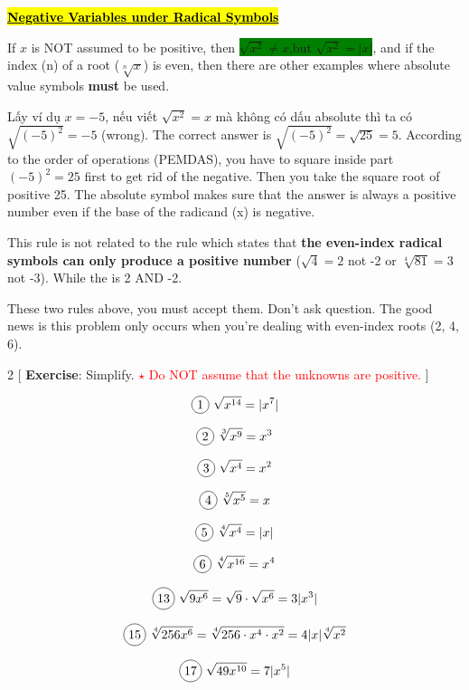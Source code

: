 \vspace{0.3 cm}

\centerline{\underline{\textbf{\large \hl{Negative Variables under Radical Symbols}}}}

\begin{tcolorbox}[colback=red!5!white,colframe=red!75!black]
  If $x$ is NOT assumed to be positive, then \colorbox{green}{$\sqrt{x^{2}} \neq x$,but $\sqrt{x^{2}}=|x|$}, and if the index (n) of a root ($\sqrt[n]{x}$) is even, then there are other examples where absolute value symbols \textbf{must} be used.
\end{tcolorbox}

Lấy ví dụ $x=-5$, nếu viết $\sqrt{x^{2}}=x$ mà không có dấu absolute thì ta có $\sqrt{(-5)^{2}}=-5$ (wrong). The correct answer is $\sqrt{(-5)^{2}}=\sqrt{25}=5$. According to the order of operations (PEMDAS), you have to square inside part $(-5)^{2}=25$ first to get rid of the negative. Then you take the square root of positive 25. The absolute symbol makes sure that the answer is always a positive number even if the base of the radicand (x) is negative.

This rule is not related to the rule which states that \textbf{the even-index radical symbols can only produce a positive number} ($\sqrt{4}=2$ not -2 or $\sqrt[4]{81}=3$ not -3). While the  is 2 AND -2.

These two rules above, you must accept them. Don't ask question. The good news is this problem only occurs when you're dealing with even-index roots (2, 4, 6).

\vspace{.5cm}

\begin{multicols}{2}
[
  \textbf{Exercise}: Simplify. \textcolor{red}{{\LARGE $\star$} Do NOT assume that the unknowns are positive.}
]

\begin{align*}
  \circled{1}\ \sqrt{x^{14}}=|x^{7}|
\end{align*}

  \[\circled{2}\ \sqrt[3]{x^{9}}=x^{3}\]

  \[\circled{3}\ \sqrt{x^{4}}=x^{2}\]

  \[\circled{4}\ \sqrt[5]{x^{5}}=x\]

  \[\circled{5}\ \sqrt[4]{x^{4}}=|x|\]

  \[\circled{6}\ \sqrt[4]{x^{16}}=x^{4}\]

  \[\circled{13}\ \sqrt{9x^{6}}=\sqrt{9}\cdot \sqrt{x^{6}}=3|x^{3}|\]
  
  \[\circled{15}\ \sqrt[4]{256x^{6}}=\sqrt[4]{256\cdot x^{4}\cdot x^{2}}=4|x|\sqrt[4]{x^{2}}\]

  \[\circled{17}\ \sqrt{49x^{10}}=7|x^{5}|\]

\end{multicols}

